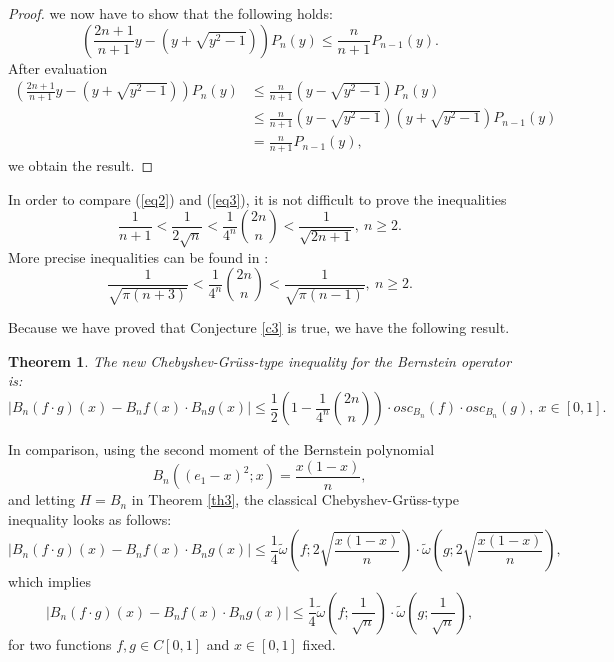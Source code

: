 \documentclass[12pt,leqno,a4paper,dvips,twoside]{article}
\newtheorem{thm}{Theorem}[section]
\begin{document}
{\begin{proof}
	we now have to show that the following holds:
		\begin{equation*}
			\left(\frac{2n+1}{n+1}y-(y+\sqrt{y^2-1})\right)P_n(y)\leq \frac{n}{n+1}P_{n-1}(y).
		\end{equation*}
	After evaluation
		\begin{align*}
			\left(\frac{2n+1}{n+1}y-(y+\sqrt{y^2-1})\right)P_n(y)&\leq \frac{n}{n+1}(y-\sqrt{y^2-1})P_n(y)\\
			&\leq \frac{n}{n+1}(y-\sqrt{y^2-1})(y+\sqrt{y^2-1})P_{n-1}(y)\\
			&=\frac{n}{n+1}P_{n-1}(y),
		\end{align*}
	we obtain the result. 
\end{proof}

In order to compare (\ref{eq2}) and (\ref{eq3}), it is not difficult to prove the inequalities
	\begin{equation*}
		\frac{1}{n+1}< \frac{1}{2\sqrt{n}}< \frac{1}{4^n}\binom{2n}{n}< \frac{1}{\sqrt{2n+1}},\ n\geq 2.
	\end{equation*}
More precise inequalities can be found in \cite{elpre:2012}:
	\begin{equation*}
		\frac{1}{\sqrt{\pi(n+3)}}< \frac{1}{4^n}\binom {2n}{n}< \frac{1}{\sqrt{\pi(n-1)}}, \ n\geq 2. 
	\end{equation*}
	
Because we have proved that Conjecture \ref{c3} is true, we have the following result.
\begin{thm} 
The new Chebyshev-Gr\"{u}ss-type inequality for the Bernstein operator is:
	\begin{equation}\label{eqgamma}
		\left|B_n(f\cdot g)(x)-B_nf(x)\cdot B_ng(x)\right|\leq\frac{1}{2}\left(1-\frac{1}{4^n}\binom{2n}{n}\right)\cdot osc_{B_n}(f)\cdot osc_{B_n}(g),\ x\in[0,1].
	\end{equation}
\end{thm}

In comparison, using the second moment of the Bernstein polynomial
	\begin{equation*}
		B_n((e_1-x)^2;x)=\frac{x(1-x)}{n},
	\end{equation*}
and letting $H=B_n$ in Theorem \ref{th3}, the classical Chebyshev-Gr\"{u}ss-type inequality looks as follows:
	\begin{equation}\label{eqeta}
		\left|B_n(f\cdot g)(x)-B_nf(x)\cdot B_ng(x)\right|\leq \frac{1}{4}\widetilde{\omega}\left(f;2\sqrt{\frac{x(1-x)}{n}}\right)\cdot\widetilde{\omega}\left(g;2\sqrt{\frac{x(1-x)}{n}}\right),
	\end{equation}
	which implies
	\begin{equation}\label{eqepsilon}
	\left|B_n(f\cdot g)(x)-B_nf(x)\cdot B_ng(x)\right|\leq \frac{1}{4}\widetilde{\omega}\left(f;\frac{1}{\sqrt{n}}\right)\cdot\widetilde{\omega}\left(g;\frac{1}{\sqrt{n}}\right),	
	\end{equation} 
for two functions $f,g\in C[0,1]$ and $x\in [0,1]$ fixed. 

}
\end{document}
